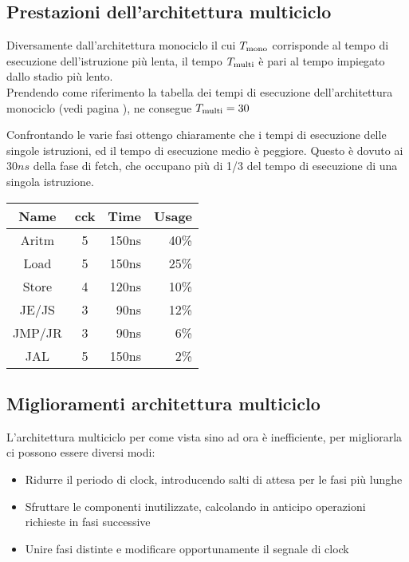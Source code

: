 \documentclass[../ace.tex]{subfiles}
\begin{document}
\subsection{Prestazioni dell'architettura multiciclo}
\begin{minipage}[t]{.66\textwidth}
    \vspace{0pt}
    Diversamente dall'architettura monociclo il cui $T_\text{mono}$ corrisponde al tempo di esecuzione dell'istruzione più lenta,
    il tempo $T_\text{multi}$ è pari al tempo impiegato dallo stadio più lento.
    \\
    Prendendo come riferimento la tabella dei tempi di esecuzione dell'architettura monociclo (vedi pagina
    \pageref{tab:tempi_esecuzione_monociclo}), ne consegue $T_\text{multi} =30$

    Confrontando le varie fasi ottengo chiaramente che i tempi di esecuzione delle singole istruzioni, ed il tempo di
    esecuzione medio è peggiore. Questo è dovuto ai $30ns$ della fase di fetch, che occupano più di 1/3 del tempo di
    esecuzione di una singola istruzione.
\end{minipage}
\begin{minipage}[t]{.33\textwidth}
    \footnotesize
    \let\fs\tiny
    \vspace{-2em}
    \begin{center}
        \begin{tabu}{|c|c|r|r|}
            \hline
            \rowfont{\bfseries\centering}
            Name & cck & Time & Usage \\
            \hline
            \hline
            Aritm  & 5& 150ns &40\fs\%\\
            \hline
            Load & 5& 150ns   &25\fs\%\\
            \hline
            Store & 4& 120ns  &10\fs\%\\
            \hline
            JE/JS& 3& 90ns    &12\fs\%\\
            \hline
            JMP/JR& 3& 90ns   &6\fs\%\\
            \hline
            JAL& 5& 150ns     &2\fs\%\\
            \hline
        \end{tabu}
    \end{center}
\end{minipage}

\subsection{Miglioramenti architettura multiciclo}
L'architettura multiciclo per come vista sino ad ora è inefficiente, per migliorarla ci possono essere diversi modi:
\begin{itemize}
    \item Ridurre il periodo di clock, introducendo salti di attesa per le fasi più lunghe
    \item Sfruttare le componenti inutilizzate, calcolando in anticipo operazioni richieste in fasi successive
    \item Unire fasi distinte e modificare opportunamente il segnale di clock
\end{itemize}
\end{document}
